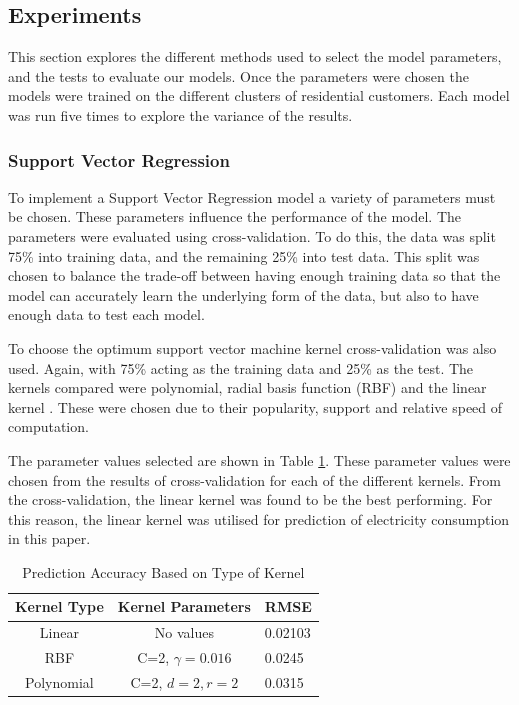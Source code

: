 \subsection{Experiments}

This section explores the different methods used to select the model parameters, and the tests to evaluate our models. Once the parameters were chosen the models were trained on the different clusters of residential customers. Each model was run five times to explore the variance of the results.  

\subsubsection{Support Vector Regression}

To implement a Support Vector Regression model a variety of parameters must be chosen. These parameters influence the performance of the model. The parameters were evaluated using cross-validation. To do this, the data was split 75\% into training data, and the remaining 25\% into test data. This split was chosen to balance the trade-off between having enough training data so that the model can accurately learn the underlying form of the data, but also to have enough data to test each model.

To choose the optimum support vector machine kernel cross-validation was also used. Again, with 75\% acting as the training data and 25\% as the test. The kernels compared were polynomial, radial basis function (RBF) and the linear kernel \cite{Chang2010, theodoridis2009pattern}. These were chosen due to their popularity, support and relative speed of computation.

The parameter values selected are shown in Table \ref{tab:kernel}. These parameter values were chosen from the results of cross-validation for each of the different kernels.  From the cross-validation, the linear kernel was found to be the best performing. For this reason, the linear kernel was utilised for prediction of electricity consumption in this paper.

\begin{table}
\centering
	\label{tab:kernel}
	\begin{tabular}{ccl}
		\toprule
		Kernel Type& Kernel Parameters & RMSE\\
		\midrule
		Linear & No values & 0.02103\\
		RBF & C=2, $\gamma=0.016$ & 0.0245\\
		Polynomial & C=2, $d=2, r=2$ & 0.0315 \\
		\bottomrule
	\end{tabular}
\caption{Prediction Accuracy Based on Type of Kernel}
\end{table}


